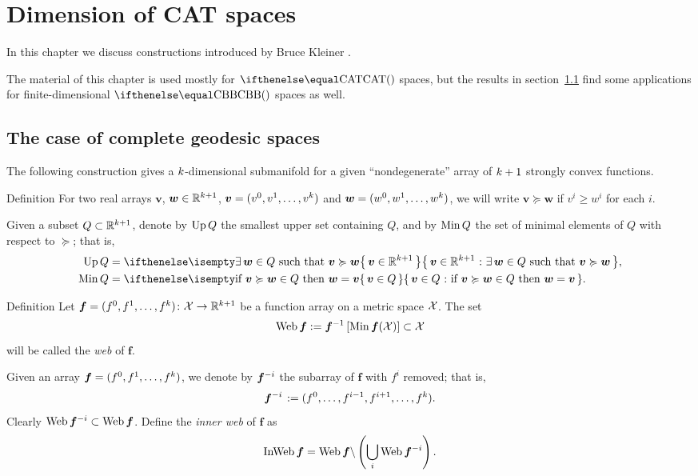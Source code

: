 \chapter{Dimension of CAT spaces}\label{chap:web+bary}

In this chapter we discuss constructions introduced by Bruce Kleiner \cite{kleiner}.

The material of this chapter is used mostly for $\CAT{}$ spaces, 
but the results in section~\ref{sec:web-general} find some applications for finite-dimensional $\Alex{}$ spaces as well.

\section{The case of complete geodesic spaces}\label{sec:web-general}

The following construction gives a $k$-dimensional submanifold 
for a given ``nondegenerate'' array of $k+1$ strongly convex functions.

\begin{thm}{Definition}\label{def:ordung}
For two real arrays $\bm{v}$, $\bm{w}\in \RR^{\kay+1}$,
$\bm{v}=(v^0,v^1,\dots,v^\kay)$ 
and 
$\bm{w}=(w^0,w^1,\dots,w^\kay)$, 
we will write
$\bm{v}\succcurlyeq\bm{w}$ if $v^i\ge w^i$ for each $i$.
\end{thm}

Given a subset $Q\subset \RR^{\kay+1}$, 
denote by $\mathop{\rm Up}\nolimits Q$ \label{PAGE.def:Up}
the smallest upper set containing $Q$, 
and by 
$\mathop{\rm Min}\nolimits Q$ the set of minimal elements of $Q$ with respect to $\succcurlyeq$;
that is,
\begin{align*}
\Up Q 
&=
\set{\bm{v}\in\RR^{\kay+1}}{\exists\, \bm{w}\in Q\ \text{such that}\ \bm{v}\succcurlyeq\bm{w}},
\\
\Min Q 
&=
\set{\bm{v}\in Q}{\text{if}\ \bm{v}\succcurlyeq\bm{w}\in Q\ \text{then}\ \bm{w}=\bm{v}}.
\end{align*}


\begin{thm}{Definition}\label{def:web}
Let $\bm{f}=(f^0,f^1,\dots,f^\kay)\:\spc{X}\to \RR^{\kay+1}$ be a function array on a metric space $\mathcal{X}$.
The set 
\[\Web\bm{f}
\df
\bm{f}^{-1}\left[\Min\bm{f}(\spc{X})\right]
\subset 
\spc{X}\] 
will be called the \emph{web} of $\bm{f}$.
\end{thm}

Given an array $\bm{f}=(f^0,f^1,\dots,f^\kay)$,
we denote by $\bm{f}^{{-} i}$ the subarray of $\bm{f}$ with $f^i$ removed;
that is, 
\[\bm{f}^{\without i\,}\df(f^0,\dots,f^{i-1},f^{i+1},\dots,f^\kay).\]
Clearly 
$\Web\bm{f}^{\without i}\subset \Web\bm{f}$.
Define the \emph{inner web} of $\bm{f}$ 
as 
\[\mathop{\rm InWeb}\nolimits\bm{f}
=
\mathop{\rm Web}\nolimits\bm{f}\backslash\left(\bigcup_{i}\mathop{\rm Web}\nolimits\bm{f}^{{-} i}\right).\]



